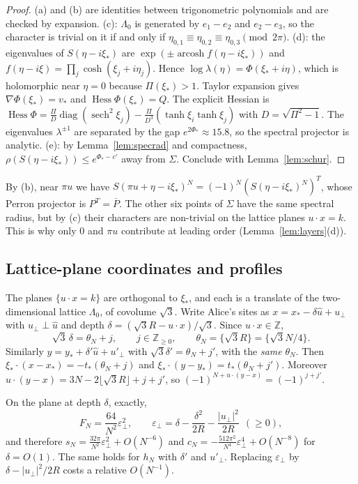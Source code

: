 \documentclass[11pt]{amsart}
\theoremstyle{definition}
\theoremstyle{remark}
\newcommand{\Z}{\mathbb{Z}}
\newcommand{\arcosh}{\operatorname{arcosh}}
\newcommand{\Hess}{\operatorname{Hess}}
\newcommand{\uhat}{\hat u}
\begin{document}
\begin{proof}
(a) and (b) are identities between trigonometric polynomials and are checked
by expansion.  (c): $\Lambda_0$ is generated by $e_1-e_2$ and $e_2-e_3$, so
the character is trivial on it if and only if
$\eta_{0,1}\equiv\eta_{0,2}\equiv\eta_{0,3}\pmod{2\pi}$.  (d): the
eigenvalues of $S(\eta-i\xi_*)$ are
$\exp(\pm\arcosh f(\eta-i\xi_*))$ and
$f(\eta-i\xi)=\prod_j\cosh(\xi_j+i\eta_j)$.  Hence
$\log\lambda(\eta)=\Phi(\xi_*+i\eta)$, which is holomorphic near $\eta=0$
because $\Pi(\xi_*)>1$.  Taylor expansion gives $\nabla\Phi(\xi_*)=v_*$ and
$\Hess\Phi(\xi_*)=Q$.  The explicit Hessian is
$\Hess\Phi=\frac{\Pi}{D}\operatorname{diag}(\operatorname{sech}^2\xi_j)-\frac{\Pi}{D^3}(\tanh\xi_i\tanh\xi_j)$
with $D=\sqrt{\Pi^2-1}$.  The eigenvalues $\lambda^{\pm1}$ are separated
by the gap $e^{2\Phi_*}\approx15.8$, so the spectral projector is analytic.
(e): by Lemma~\ref{lem:specrad} and compactness,
$\rho(S(\eta-i\xi_*))\le e^{\Phi_*-c'}$ away from $\Sigma$.  Conclude with
Lemma~\ref{lem:schur}.
\end{proof}

By (b), near $\pi u$ we have $S(\pi u+\eta-i\xi_*)^N=(-1)^N(S(\eta-i\xi_*)^N)^T$,
whose Perron projector is $P^T=\overline P$.  The other six points of
$\Sigma$ have the same spectral radius, but by (c) their characters are
non-trivial on the lattice planes $u\cdot x=k$.  This is why only $0$ and
$\pi u$ contribute at leading order (Lemma~\ref{lem:layers}(d)).

\subsection{Lattice-plane coordinates and profiles}
The planes $\{u\cdot x=k\}$ are orthogonal to $\xi_*$, and each is a translate
of the two-dimensional lattice $\Lambda_0$, of covolume $\sqrt3$.  Write
Alice's sites as $x=x_*-\delta\uhat+u_\perp$ with $u_\perp\perp\uhat$ and
depth $\delta=(\sqrt3R-u\cdot x)/\sqrt3$.  Since $u\cdot x\in\Z$,
\[
\sqrt3\,\delta=\theta_N+j,\qquad j\in\Z_{\ge0},\qquad \theta_N=\{\sqrt3R\}=\{\sqrt3N/4\}.
\]
Similarly $y=y_*+\delta'\uhat+u'_\perp$ with $\sqrt3\delta'=\theta_N+j'$, with
the \emph{same} $\theta_N$.  Then
$\xi_*\cdot(x-x_*)=-t_*(\theta_N+j)$ and $\xi_*\cdot(y-y_*)=t_*(\theta_N+j')$.
Moreover $u\cdot(y-x)=3N-2\lfloor\sqrt3R\rfloor+j+j'$, so
$(-1)^{N+u\cdot(y-x)}=(-1)^{j+j'}$.

On the plane at depth $\delta$, exactly,
\[
F_N=\frac{64}{N^2}\varepsilon_\perp^2,\qquad
\varepsilon_\perp=\delta-\frac{\delta^2}{2R}-\frac{|u_\perp|^2}{2R}\ \ (\ge0),
\]
and therefore
$s_N=\frac{32\pi}{N^2}\varepsilon_\perp^2+O(N^{-6})$ and
$c_N=-\frac{512\pi^2}{N^4}\varepsilon_\perp^4+O(N^{-8})$ for $\delta=O(1)$.  The
same holds for $h_N$ with $\delta'$ and $u'_\perp$.  Replacing
$\varepsilon_\perp$ by $\delta-|u_\perp|^2/2R$ costs a relative $O(N^{-1})$.
\end{document}
